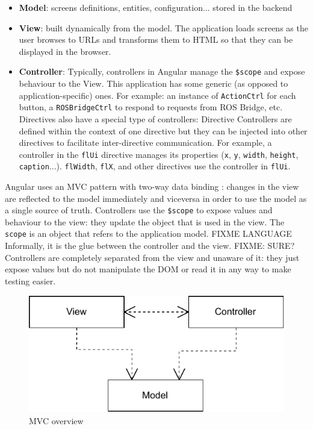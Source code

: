 \begin{itemize}
    \item \textbf{Model}: screens definitions, entities, configuration... stored in the backend
    \item \textbf{View}: built dynamically from the model. The application loads screens as the user browses to \ac{URL}s and transforms them to \ac{HTML} so that they can be displayed in the browser.
    \item \textbf{Controller}: Typically, controllers in Angular manage the \texttt{\$scope} and expose behaviour to the View. This application has some generic (as opposed to application-specific) ones. For example: an instance of \texttt{ActionCtrl} for each button, a \texttt{ROSBridgeCtrl} to respond to requests from ROS Bridge, etc. Directives also have a special type of controllers: Directive Controllers are defined within the context of one directive but they can be injected into other directives to facilitate inter-directive communication. For example, a controller in the \texttt{flUi} directive manages its properties (\texttt{x}, \texttt{y}, \texttt{width}, \texttt{height}, \texttt{caption}...). \texttt{flWidth}, \texttt{flX}, and other directives use the controller in \texttt{flUi}.
\end{itemize}

Angular uses an \ac{MVC} pattern with two-way data binding : changes in the view are reflected to the model immediately and viceversa in order to use the model as a single source of truth.
Controllers use the \texttt{\$scope} to expose values and behaviour to the view: they update the object that is used in the view.
The \texttt{scope} is an object that refers to the application model.
FIXME LANGUAGE Informally, it is the glue between the controller and the view.
FIXME: SURE? Controllers are completely separated from the view and unaware of it: they just expose values but do not manipulate the \ac{DOM} or read it in any way to make testing easier.

\begin{figure}[htb]
    \centering
    \includegraphics{figures/design-patterns-mvc-1.pdf}
    \caption{\ac{MVC} overview}
    \label{fig:mvc-overview}
\end{figure}

